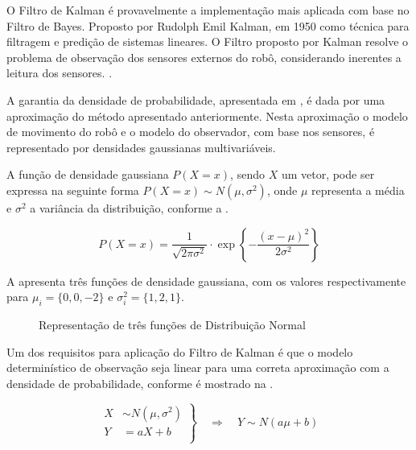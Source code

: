 O Filtro de Kalman é provavelmente a implementação mais aplicada com base no Filtro de Bayes. Proposto por Rudolph Emil Kalman, em 1950 como técnica para filtragem e predição de sistemas lineares. O Filtro proposto por Kalman resolve o problema de observação dos sensores externos do robô, considerando inerentes a leitura dos sensores. \cite{thrun2006probalistic,romero2014robotica}.

A garantia da densidade de probabilidade, apresentada em , é dada por uma aproximação do método apresentado anteriormente. Nesta aproximação o modelo de movimento do robô e o modelo do observador, com base nos sensores, é representado por densidades gaussianas multivariáveis.

A função de densidade gaussiana $P(X = x)$, sendo $X$ um vetor, pode ser expressa na seguinte forma ${P(X = x) \sim N(\mu, \sigma^2)}$, onde $\mu$ representa a média e $\sigma^2$ a variância da distribuição, conforme a  .

\begin{equation}
    \label{eq:gauss1}
    P(X = x) = \dfrac{1}{\sqrt{2\pi\sigma^2}}\cdot 
    \exp\left\{-\frac{(x-\mu)^2}{2\sigma^2}\right\}
\end{equation}

A  apresenta três funções de densidade gaussiana, com os valores respectivamente para $\mu_i = \{0,0,-2\}$ e $\sigma^2_i = \{1,2,1\}$.

\begin{figure}[!ht]
    \centering
    
    \caption{Representação de três funções de Distribuição Normal}
    \label{fig::gauss1}
\end{figure}

Um dos requisitos para aplicação do Filtro de Kalman é que o modelo determinístico de observação seja linear para uma correta aproximação com a densidade de probabilidade, conforme é mostrado na  .

\begin{equation}
    \label{eq::linear1d}
    \left.
    \begin{aligned}
            X & \sim N\left(\mu, \sigma^2\right)\\
            Y & = aX + b\\
    \end{aligned} \right\}
    \quad \Rightarrow \quad Y \sim N\left(a\mu+b\right)
\end{equation}

